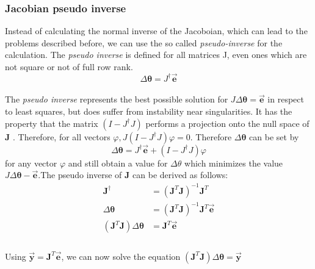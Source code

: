 \subsubsection{Jacobian pseudo inverse}
Instead of calculating the normal inverse of the Jacoboian, which can lead to the problems described before, we can use the so called \textit{pseudo-inverse} \cite{Dahmen.2008} for the calculation. The \textit{pseudo inverse} is defined for all matrices J, even ones
which are not square or not of full row rank.\\
\begin{equation}
\label{pseudo inv def}
\Delta\pmb{\theta}=J^{\dagger}\vec{\pmb{e}}
\end{equation}
\\The \textit{pseudo inverse} represents the best possible solution for $ J\Delta\pmb{\theta}=\vec{\pmb{e}}$ in respect to least squares, but does suffer from instability near singularities. It has the property that the matrix $(I − J^{\dagger}J)$ performs a projection onto the null space of \textbf{J} . Therefore, for all vectors $\varphi, J(I −J^{\dagger}J)\varphi = 0$. Therefore $\Delta\pmb{\theta}$ can be set by
\begin{equation}
\Delta\pmb{\theta}=J^{\dagger}\vec{\pmb{e}}+(I-J^{\dagger}J)\varphi
\end{equation}
for any vector $\varphi$ and still obtain a value for $\Delta\theta$ which minimizes the value $ J\Delta\pmb{\theta} −\vec{\pmb{e}}$.The pseudo inverse of \textbf{J} can be derived as follows:\\
\begin{equation}
\begin{split}
\pmb{J}^{\dagger}&=(\pmb{J}^{T}\pmb{J})^{-1}\pmb{J}^{T}\\
\Delta\pmb{\theta}&=(\pmb{J}^{T}\pmb{J})^{-1}\pmb{J}^{T}\vec{\pmb{e}}\\
(\pmb{J}^{T}\pmb{J})\Delta\pmb{\theta}&=\pmb{J}^{T}\vec{\pmb{e}}\\
\end{split}
\end{equation}
\\Using $\vec{\pmb{y}}=\pmb{J}^{T}\vec{\pmb{e}}$, we can now solve the equation $(\pmb{J}^{T}\pmb{J})\Delta\pmb{\theta}=\vec{\pmb{y}}$

